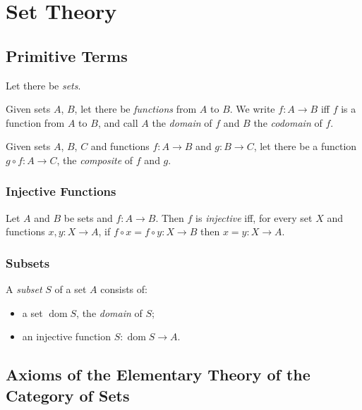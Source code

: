 \newcommand{\id}[1]{\ensuremath{\mathrm{id}_{#1}}}
\newcommand{\finsubseteq}{\ensuremath{\subseteq^{\mathrm{fin}}}}
\newcommand{\dom}{\ensuremath{\operatorname{dom}}}
\newcommand{\ran}{\ensuremath{\operatorname{ran}}}

\chapter{Set Theory}

\section{Primitive Terms}

Let there be \emph{sets}.

Given sets $A$, $B$, let there be \emph{functions} from $A$ to $B$.
We write $f : A \rightarrow B$ iff $f$ is a function from $A$ to $B$, and call $A$ the \emph{domain} of $f$ and $B$ the \emph{codomain} of $f$.

Given sets $A$, $B$, $C$ and functions $f : A \rightarrow B$ and $g : B \rightarrow C$, let there be a function $g \circ f : A \rightarrow C$, the \emph{composite} of $f$ and $g$.

\subsection{Injective Functions}

\begin{df}[Injective]
  Let $A$ and $B$ be sets and $f : A \rightarrow B$. Then $f$ is \emph{injective} iff, for every set $X$ and functions $x, y : X \rightarrow A$, if $f \circ x = f \circ y : X \rightarrow B$ then $x = y : X \rightarrow A$.
\end{df}

\subsection{Subsets}

\begin{df}[Subset]
  A \emph{subset} $S$ of a set $A$ consists of:
  \begin{itemize}
    \item a set $\dom S$, the \emph{domain} of $S$;
    \item an injective function $S : \dom S \rightarrow A$.
  \end{itemize}
\end{df}

\section{Axioms of the Elementary Theory of the Category of Sets}

